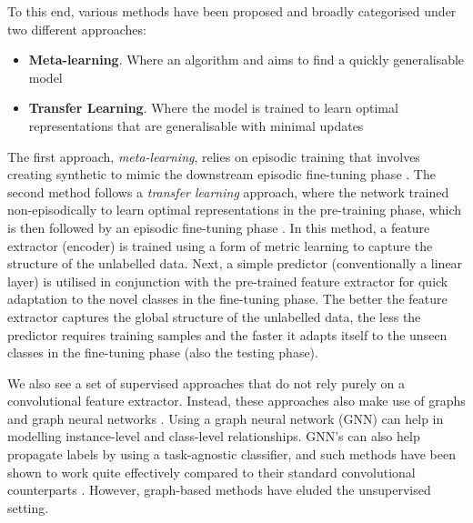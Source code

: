To this end, various methods have been proposed and broadly categorised under two different approaches:
\begin{itemize}
    \item \textbf{Meta-learning}. Where an algorithm  and aims to find a quickly generalisable model
    \item \textbf{Transfer Learning}. Where the model is trained to learn optimal representations that are generalisable with minimal updates
\end{itemize}

The first approach, \textit{meta-learning}, relies on episodic training that involves creating synthetic  to mimic the downstream episodic fine-tuning phase \parencite{Finn2017Model-agnosticNetworks, Hsu2018UnsupervisedMeta-Learning, Khodadadeh2018UnsupervisedClassification, Antoniou2019AssumeAugmentation, Ye2022, lee2021meta, Ji2019UnsupervisedTraining}. 
The second method follows a \textit{transfer learning} approach, where the network trained non-episodically to learn optimal representations in the pre-training phase, which is then followed by an episodic fine-tuning phase \parencite{Medina2020Self-SupervisedClassification, goodemballneed2020, dhillon2019baseline}.
In this method, a feature extractor (encoder) is trained using a form of metric learning to capture the structure of the unlabelled data. 
Next, a simple predictor (conventionally a linear layer) is utilised in conjunction with the pre-trained feature extractor for quick adaptation to the novel classes in the fine-tuning phase.
The better the feature extractor captures the global structure of the unlabelled data, the less the predictor requires training samples and the faster it adapts itself to the unseen classes in the fine-tuning phase (also the testing phase).

We also see a set of supervised approaches that do not rely purely on a convolutional feature extractor. Instead, these approaches also make use of graphs and graph neural networks \parencite{garcia2018fewshot, kim2019edge, yu2022hybrid, yang2020dpgn}. Using a graph neural network (GNN) can help in modelling instance-level and class-level relationships. GNN's can also help propagate labels by using a task-agnostic classifier, and such methods have been shown to work quite effectively compared to their standard convolutional counterparts \parencite{kim2019edge, garcia2018fewshot, yu2022hybrid, yang2020dpgn}. However, graph-based methods have eluded the unsupervised setting.

